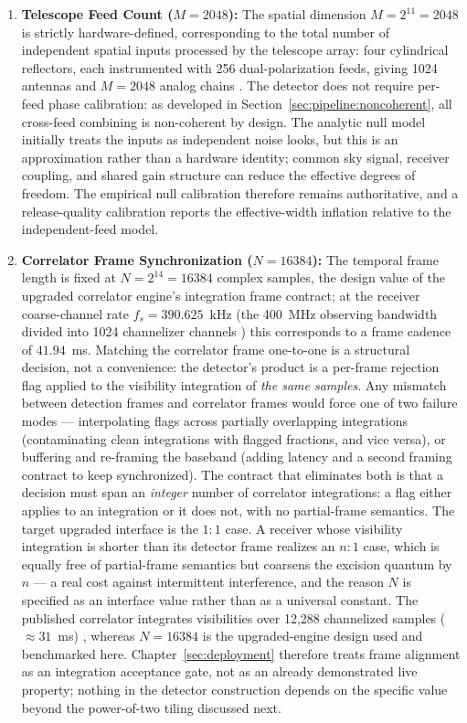 \begin{enumerate}
    \item \textbf{Telescope Feed Count ($M = 2048$):} The spatial dimension $M = 2^{11} = 2048$ is strictly hardware-defined, corresponding to the total number of independent spatial inputs processed by the telescope array: four cylindrical reflectors, each instrumented with 256 dual-polarization feeds, giving 1024 antennas and $M = 2048$ analog chains \cite{amiri2022chime}. The detector does not require per-feed phase calibration: as developed in Section~\ref{sec:pipeline:noncoherent}, all cross-feed combining is non-coherent by design.  The analytic null model initially treats the inputs as independent noise looks, but this is an approximation rather than a hardware identity; common sky signal, receiver coupling, and shared gain structure can reduce the effective degrees of freedom.  The empirical null calibration therefore remains authoritative, and a release-quality calibration reports the effective-width inflation relative to the independent-feed model.

    \item \textbf{Correlator Frame Synchronization ($N = 16384$):} The temporal frame length is fixed at $N = 2^{14} = 16384$ complex samples, the design value of the upgraded correlator engine's integration frame contract; at the receiver coarse-channel rate $f_s = 390.625$~kHz (the 400~MHz observing bandwidth divided into 1024 channelizer channels \cite{amiri2022chime}) this corresponds to a frame cadence of $41.94$~ms. Matching the correlator frame one-to-one is a structural decision, not a convenience: the detector's product is a per-frame rejection flag applied to the visibility integration of \emph{the same samples}. Any mismatch between detection frames and correlator frames would force one of two failure modes --- interpolating flags across partially overlapping integrations (contaminating clean integrations with flagged fractions, and vice versa), or buffering and re-framing the baseband (adding latency and a second framing contract to keep synchronized). The contract that eliminates both is that a decision must span an \emph{integer} number of correlator integrations: a flag either applies to an integration or it does not, with no partial-frame semantics. The target upgraded interface is the $1{:}1$ case. A receiver whose visibility integration is shorter than its detector frame realizes an $n{:}1$ case, which is equally free of partial-frame semantics but coarsens the excision quantum by $n$ --- a real cost against intermittent interference, and the reason $N$ is specified as an interface value rather than as a universal constant. The published correlator integrates visibilities over 12{,}288 channelized samples ($\approx31$~ms) \cite{amiri2022chime}, whereas $N = 16384$ is the upgraded-engine design used and benchmarked here. Chapter~\ref{sec:deployment} therefore treats frame alignment as an integration acceptance gate, not as an already demonstrated live property; nothing in the detector construction depends on the specific value beyond the power-of-two tiling discussed next.


\end{enumerate}
